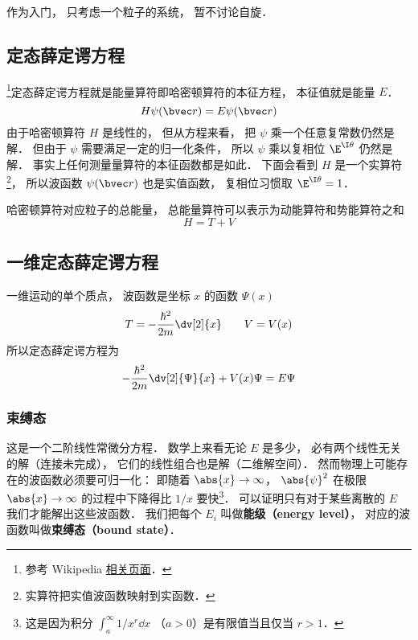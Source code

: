 
\begin{issues}
\issueTODO
\end{issues}


作为入门， 只考虑一个粒子的系统， 暂不讨论自旋．

\subsection{定态薛定谔方程}
\footnote{参考 Wikipedia \href{https://en.wikipedia.org/wiki/Finite_potential_well}{相关页面}．}定态薛定谔方程就是能量算符即哈密顿算符的本征方程， 本征值就是能量 $E$．
\begin{equation}
H \psi(\bvec r) = E \psi(\bvec r)
\end{equation}
由于哈密顿算符 $H$ 是线性的， 但从方程来看， 把 $\psi$ 乘一个任意复常数仍然是解． 但由于 $\psi$ 需要满足一定的归一化条件， 所以 $\psi$ 乘以复相位 $\E^{\I\theta}$ 仍然是解． 事实上任何测量量算符的本征函数都是如此． 下面会看到 $H$ 是一个实算符\footnote{实算符把实值波函数映射到实函数．}， 所以波函数 $\psi(\bvec r)$ 也是实值函数， 复相位习惯取 $\E^{\I\theta} = 1$．

哈密顿算符对应粒子的总能量， 总能量算符可以表示为动能算符和势能算符之和
\begin{equation}
H = T + V
\end{equation}

\subsection{一维定态薛定谔方程}

一维运动的单个质点， 波函数是坐标 $x$ 的函数 $\Psi(x)$
\begin{equation}
T = -\frac{\hbar^2}{2m} \dv[2]{x} \qquad V = V(x)
\end{equation}
所以定态薛定谔方程为
\begin{equation}\label{SchEq_eq1}
-\frac{\hbar^2}{2m} \dv[2]{\Psi}{x} + V(x)\Psi = E \Psi
\end{equation}

\subsubsection{束缚态}
这是一个二阶线性常微分方程． 数学上来看无论 $E$ 是多少， 必有两个线性无关的解（连接未完成）， 它们的线性组合也是解（二维解空间）． 然而物理上可能存在的波函数必须要可归一化： 即随着 $\abs{x} \to \infty$，  $\abs{\psi}^2$ 在极限 $\abs{x}\to\infty$ 的过程中下降得比 $1/x$ 要快\footnote{这是因为积分 $\int_a^\infty 1/x^r \dd{x}$ （$a > 0$）是有限值当且仅当 $r > 1$．}． 可以证明只有对于某些离散的 $E$ 我们才能解出这些波函数． 我们把每个 $E_i$ 叫做\textbf{能级（energy level）}， 对应的波函数叫做\textbf{束缚态（bound state）}．

